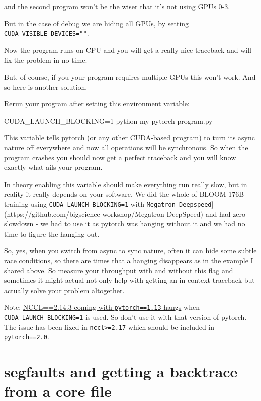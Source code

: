 \documentclass[
]{report}
\newenvironment{Shaded}{\begin{snugshade}}{\end{snugshade}}
\newcommand{\ExtensionTok}[1]{\textcolor[rgb]{0.00,0.23,0.31}{#1}}
\newcommand{\NormalTok}[1]{\textcolor[rgb]{0.00,0.23,0.31}{#1}}
\newcommand{\OperatorTok}[1]{\textcolor[rgb]{0.37,0.37,0.37}{#1}}
\newcommand{\VariableTok}[1]{\textcolor[rgb]{0.07,0.07,0.07}{#1}}
\begin{document}
and the second program won't be the wiser that it's not using GPUs 0-3.

But in the case of debug we are hiding all GPUs, by setting
\texttt{CUDA\_VISIBLE\_DEVICES=""}.

Now the program runs on CPU and you will get a really nice traceback and
will fix the problem in no time.

But, of course, if you your program requires multiple GPUs this won't
work. And so here is another solution.

Rerun your program after setting this environment variable:

\begin{Shaded}
\begin{Highlighting}[]
\VariableTok{CUDA\_LAUNCH\_BLOCKING}\OperatorTok{=}\NormalTok{1 }\ExtensionTok{python}\NormalTok{ my{-}pytorch{-}program.py}
\end{Highlighting}
\end{Shaded}

This variable tells pytorch (or any other CUDA-based program) to turn
its async nature off everywhere and now all operations will be
synchronous. So when the program crashes you should now get a perfect
traceback and you will know exactly what ails your program.

In theory enabling this variable should make everything run really slow,
but in reality it really depends on your software. We did the whole of
BLOOM-176B training using \texttt{CUDA\_LAUNCH\_BLOCKING=1} with
\texttt{Megatron-Deepspeed}{]}(https://github.com/bigscience-workshop/Megatron-DeepSpeed)
and had zero slowdown - we had to use it as pytorch was hanging without
it and we had no time to figure the hanging out.

So, yes, when you switch from async to sync nature, often it can hide
some subtle race conditions, so there are times that a hanging
disappears as in the example I shared above. So measure your throughput
with and without this flag and sometimes it might actual not only help
with getting an in-context traceback but actually solve your problem
altogether.

Note: \href{https://github.com/NVIDIA/nccl/issues/750}{NCCL==2.14.3
coming with \texttt{pytorch==1.13} hangs} when
\texttt{CUDA\_LAUNCH\_BLOCKING=1} is used. So don't use it with that
version of pytorch. The issue has been fixed in
\texttt{nccl\textgreater{}=2.17} which should be included in
\texttt{pytorch==2.0}.

\section{segfaults and getting a backtrace from a core
file}\label{segfaults-and-getting-a-backtrace-from-a-core-file}
\end{document}
